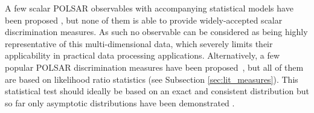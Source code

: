 \documentclass[journal]{IEEEtran}
\begin{document}
A few scalar POLSAR observables with accompanying statistical models have been proposed \cite{Conradsen_2003_TGRS_4, Alberga_2008_IJRS_4129, Joughin_1994_TGRS_562, Lee_1994_TGRS_1017, Touzi_1996_TGRS_519, Lopez-Martinez_2003_TGRS_2232, Erten_2012_Sensors_2766},
  but none of them is able to provide widely-accepted scalar discrimination measures.
As such no observable can be considered as being highly representative of this multi-dimensional data,
  which severely limits their applicability in practical data processing applications.
Alternatively, a few popular POLSAR discrimination measures have been proposed~\cite{Lee_1994_IJRS_2299, Anfinsen_2007_ESA_POLINSAR, Kersten_2005_TGRS_519, Lee_2011_IGARSS_3740, Cao_2007_TGRS_3454},
  but all of them are based on likelihood ratio statistics (see Subsection \ref{sec:lit_measures}).
This statistical test should ideally be based on an exact and consistent distribution
   but so far only asymptotic distributions have been demonstrated \cite{Conradsen_2003_TGRS_4}.  
\end{document}
